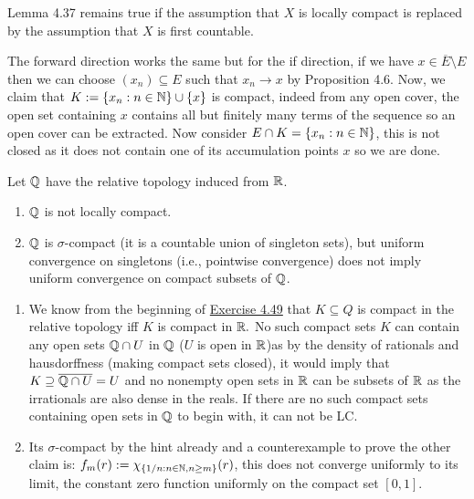 \documentclass[12pt,a4paper]{article}
\begin{document}
\begin{problem}\label{prob:4-53}
Lemma 4.37 remains true if the assumption that $X$ is locally compact is replaced by the assumption that $X$ is first countable.
\end{problem}
\begin{solution}
    The forward direction works the same but for the if direction, if we have $x\in \overline{E}\setminus E$ then we can choose $(x_n) \subseteq E$ such that $x_n\to x$ by Proposition 4.6. Now, we claim that $K:= \qty{x_n:n\in\mathbb{N}}\cup \qty{x}$ is compact, indeed from any open cover, the open set containing $x$ contains all but finitely many terms of the sequence so an open cover can be extracted. 
    Now consider $E\cap K= \qty{x_n:n\in\mathbb{N}}$, this is not closed as it does not contain one of its accumulation points $x$ so we are done. 
\end{solution}
\begin{problem}\label{prob:4-54}
Let $\mathbb{Q}$ have the relative topology induced from $\mathbb{R}$.
\begin{enumerate}[label=\alph*.]
    \item $\mathbb{Q}$ is not locally compact.
    \item $\mathbb{Q}$ is $\sigma$-compact (it is a countable union of singleton sets), but uniform convergence on singletons (i.e., pointwise convergence) does not imply uniform convergence on compact subsets of $\mathbb{Q}$.
\end{enumerate}
\end{problem}
\begin{solution}
\begin{enumerate}[label=\alph*.]
    \item
    We know from the beginning of \hyperref[prob:4-49]{Exercise 4.49} that $K \subseteq Q$ is compact in the relative topology iff $K$ is compact in $\mathbb{R}.$ 
    No such compact sets $K$ can contain any open sets $\mathbb{Q}\cap U$ in $\mathbb{Q}$ ($U$ is open in $\mathbb{R}$)as by the density of rationals and hausdorffness (making compact sets closed), it would imply that $K\supseteq \overline{\mathbb{Q}\cap U}=U$ and no nonempty open sets in $\mathbb{R}$ can be subsets of $\mathbb{R}$ as the irrationals are also dense in the reals. 
    If there are no such compact sets containing open sets in $\mathbb{Q}$ to begin with, it can not be LC. 
    \item
        Its $\sigma$-compact by the hint already and a counterexample to prove the other claim is: $f_m(r):=\chi_{ \qty{1/n:n\in\mathbb{N},n\geq m}}(r)$, this does not converge uniformly to its limit, the constant zero function uniformly on the compact set $[0,1]$.
\end{enumerate}
\end{solution}
\end{document}
